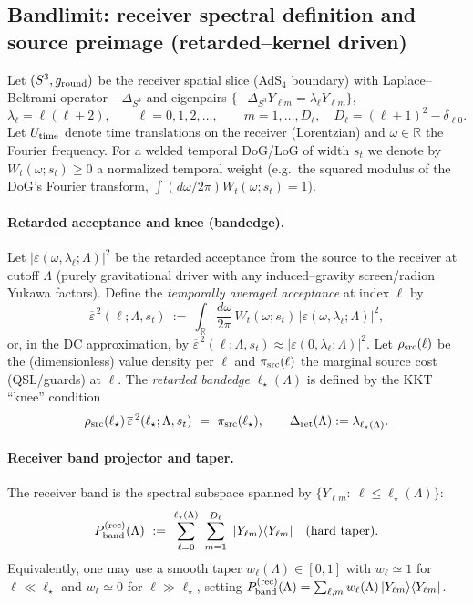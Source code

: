 \documentclass[10pt]{article}
\theoremstyle{definition}
\theoremstyle{plain}
\begin{document}
\subsection{Bandlimit: receiver spectral definition and source preimage (retarded--kernel driven)}
\label{app:receiver-bandlimit}

Let $(S^3,g_{\rm round})$ be the receiver spatial slice (AdS$_4$ boundary) with Laplace--Beltrami operator
$-\Delta_{S^3}$ and eigenpairs $\{-\Delta_{S^3}Y_{\ell m}=\lambda_\ell Y_{\ell m}\}$,
\[
\lambda_\ell=\ell(\ell+2),\qquad \ell=0,1,2,\dots,\qquad m=1,\dots,D_\ell,\quad D_\ell=(\ell+1)^2-\delta_{\ell 0}.
\]
Let $U_{\rm time}$ denote time translations on the receiver (Lorentzian) and $\omega\in\mathbb R$ the Fourier frequency.
For a welded temporal DoG/LoG of width $s_t$ we denote by $W_t(\omega;s_t)\ge 0$ a normalized temporal weight
(e.g.\ the squared modulus of the DoG’s Fourier transform, $\int (\!d\omega/2\pi) W_t(\omega;s_t)=1$).

\paragraph{Retarded acceptance and knee (bandedge).}\label{par:uom-main-231}
Let $|\varepsilon(\omega,\lambda_\ell;\Lambda)|^2$ be the retarded acceptance from the source to the receiver
at cutoff $\Lambda$ (purely gravitational driver with any induced--gravity screen/radion Yukawa factors).
Define the \emph{temporally averaged acceptance} at index $\ell$ by
\[
\overline{\varepsilon}^{\,2}(\ell;\Lambda,s_t)\ :=\ \int_{\mathbb R}\frac{d\omega}{2\pi}\,W_t(\omega;s_t)\,|\varepsilon(\omega,\lambda_\ell;\Lambda)|^2,
\]
or, in the DC approximation, by $\overline{\varepsilon}^{\,2}(\ell;\Lambda,s_t)\approx |\varepsilon(0,\lambda_\ell;\Lambda)|^2$.
Let $\rho_{\rm src}(\ell)$ be the (dimensionless) value density per $\ell$ and $\pi_{\rm src}(\ell)$ the marginal source cost
(QSL/guards) at $\ell$. The \emph{retarded bandedge} $\ell_\star(\Lambda)$ is defined by the KKT “knee” condition
\[
\rho_{\rm src}(\ell_\star)\,\overline{\varepsilon}^{\,2}(\ell_\star;\Lambda,s_t)\ =\ \pi_{\rm src}(\ell_\star),
\qquad \Delta_{\rm ret}(\Lambda):=\lambda_{\ell_\star(\Lambda)}.
\]

\paragraph{Receiver band projector and taper.}\label{par:uom-main-232}
The receiver band is the spectral subspace spanned by $\{Y_{\ell m}:\ \ell\le \ell_\star(\Lambda)\}$:
\[
P^{\rm(rec)}_{\rm band}(\Lambda)\ :=\ \sum_{\ell=0}^{\ell_\star(\Lambda)}\ \sum_{m=1}^{D_\ell}\ |Y_{\ell m}\rangle\langle Y_{\ell m}|\quad\text{(hard taper)}.
\]
Equivalently, one may use a smooth taper $w_\ell(\Lambda)\in[0,1]$ with $w_\ell\simeq 1$ for $\ell\ll \ell_\star$ and
$w_\ell\simeq 0$ for $\ell\gg \ell_\star$, setting $P^{\rm(rec)}_{\rm band}(\Lambda)=\sum_{\ell,m} w_\ell(\Lambda)\,|Y_{\ell m}\rangle\langle Y_{\ell m}|$.
\end{document}
